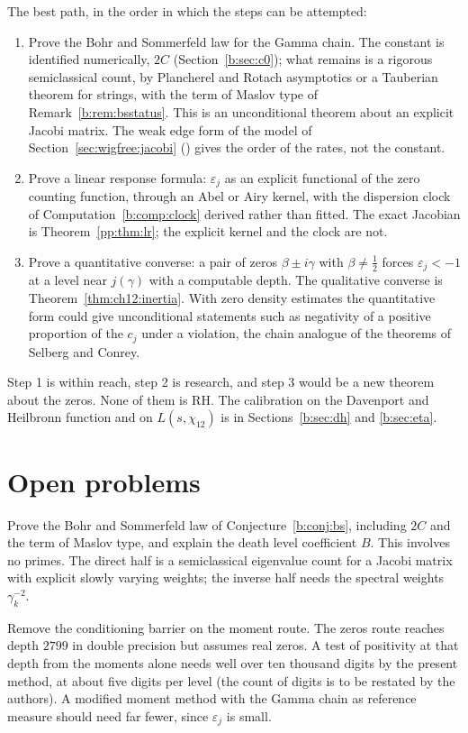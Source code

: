 The best path, in the order in which the steps can be attempted:
\begin{enumerate}
\item Prove the Bohr and Sommerfeld law for the Gamma chain. The constant is identified numerically, $2C$ (Section~\ref{b:sec:c0}); what remains is a rigorous semiclassical count, by Plancherel and Rotach asymptotics or a Tauberian theorem for strings, with the term of Maslov type of Remark~\ref{b:rem:bsstatus}. This is an unconditional theorem about an explicit Jacobi matrix. The weak edge form of the model of Section~\ref{sec:wigfree:jacobi} (\cite{KVA99}) gives the order of the rates, not the constant. %
\item Prove a linear response formula: $\varepsilon_j$ as an explicit functional of the zero counting function, through an Abel or Airy kernel, with the dispersion clock of Computation~\ref{b:comp:clock} derived rather than fitted. The exact Jacobian is Theorem~\ref{pp:thm:lr}; the explicit kernel and the clock are not.
\item Prove a quantitative converse: a pair of zeros $\beta\pm i\gamma$ with $\beta\ne\frac12$ forces $\varepsilon_j<-1$ at a level near $j(\gamma)$ with a computable depth. The qualitative converse is Theorem~\ref{thm:ch12:inertia}. With zero density estimates the quantitative form could give unconditional statements such as negativity of a positive proportion of the $c_j$ under a violation, the chain analogue of the theorems of Selberg and Conrey. %
\end{enumerate}
Step 1 is within reach, step 2 is research, and step 3 would be a new theorem about the zeros. None of them is RH. The calibration on the Davenport and Heilbronn function and on $L(s,\chi_{12})$ is in Sections~\ref{b:sec:dh} and \ref{b:sec:eta}.

\section{Open problems}

\begin{problem}
Prove the Bohr and Sommerfeld law of Conjecture~\ref{b:conj:bs}, including $2C$ and the term of Maslov type, and explain the death level coefficient $B$. This involves no primes. The direct half is a semiclassical eigenvalue count for a Jacobi matrix with explicit slowly varying weights; the inverse half needs the spectral weights $\gamma_k^{-2}$.
\end{problem}

\begin{problem}
Remove the conditioning barrier on the moment route. The zeros route reaches depth $2799$ in double precision but assumes real zeros. A test of positivity at that depth from the moments alone needs well over ten thousand digits by the present method, at about five digits per level (the count of digits is to be restated by the authors). A modified moment method with the Gamma chain as reference measure should need far fewer, since $\varepsilon_j$ is small.
\end{problem}
